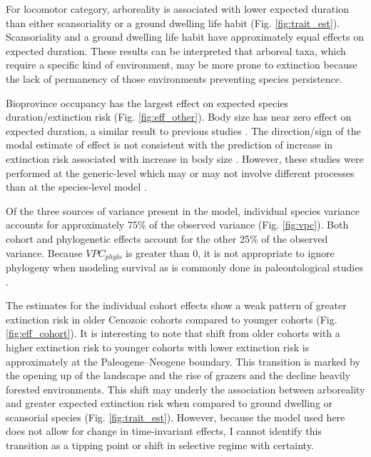 \documentclass[12pt]{article}
\begin{document}
For locomotor category, arboreality is associated with lower expected duration than either scansoriality or a ground dwelling life habit (Fig. \ref{fig:trait_est}). Scansoriality and a ground dwelling life habit have approximately equal effects on expected duration. These results can be interpreted that arboreal taxa, which require a specific kind of environment, may be more prone to extinction because the lack of permanency of those environments preventing species persistence. 

Bioprovince occupancy has the largest effect on expected species duration/extinction risk (Fig. \ref{fig:eff_other}). Body size has near zero effect on expected duration, a similar result to previous studies \cite{Tomiya2013}. The direction/sign of the modal estimate of effect is not consistent with the prediction of increase in extinction risk associated with increase in body size \cite{Liow2008}. However, these studies were performed at the generic-level which may or may not involve different processes than at the species-level model \cite{Tomiya2013,Liow2008}.

Of the three sources of variance present in the model, individual species variance accounts for approximately 75\% of the observed variance (Fig. \ref{fig:vpc}). Both cohort and phylogenetic effects account for the other 25\% of the observed variance. Because $VPC_{phylo}$ is greater than 0, it is not appropriate to ignore phylogeny when modeling survival \cite{Housworth2004} as is commonly done in paleontological studies \cite{Alroy2009,Foote2013,Jablonski2006a,Hunt2007a,Liow2008,Payne2007}. 

The estimates for the individual cohort effects show a weak pattern of greater extinction risk in older Cenozoic cohorts compared to younger cohorts (Fig. \ref{fig:eff_cohort}). It is interesting to note that shift from older cohorts with a higher extinction risk to younger cohorts with lower extinction risk is approximately at the Paleogene--Neogene boundary. This transition is marked by the opening up of the landscape and the rise of grazers and the decline heavily forested environments. This shift may underly the association between arboreality and greater expected extinction risk when compared to ground dwelling or scansorial species (Fig. \ref{fig:trait_est}). However, because the model used here does not allow for change in time-invariant effects, I cannot identify this transition as a tipping point or shift in selective regime with certainty.
\end{document}
